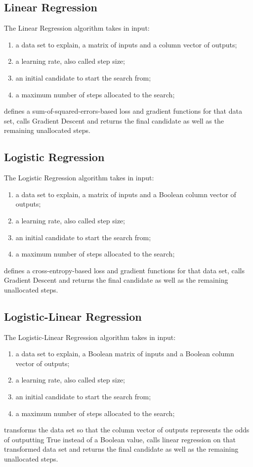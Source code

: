 \documentclass[]{report}
\begin{document}
\subsection{Linear Regression}
The Linear Regression algorithm takes in input:
\begin{enumerate}
\item a data set to explain, a matrix of inputs and a column vector
  of outputs;
\item a learning rate, also called step size;
\item an initial candidate to start the search from;
\item a maximum number of steps allocated to the search;
\end{enumerate}
defines a sum-of-squared-errors-based loss and gradient functions for
that data set, calls Gradient Descent and returns the final candidate
as well as the remaining unallocated steps.

\subsection{Logistic Regression}
The Logistic Regression algorithm takes in input:
\begin{enumerate}
\item a data set to explain, a matrix of inputs and a Boolean column
  vector of outputs;
\item a learning rate, also called step size;
\item an initial candidate to start the search from;
\item a maximum number of steps allocated to the search;
\end{enumerate}
defines a cross-entropy-based loss and gradient functions for that
data set, calls Gradient Descent and returns the final candidate as
well as the remaining unallocated steps.

\subsection{Logistic-Linear Regression}
The Logistic-Linear Regression algorithm takes in input:
\begin{enumerate}
\item a data set to explain, a Boolean matrix of inputs and a Boolean
  column vector of outputs;
\item a learning rate, also called step size;
\item an initial candidate to start the search from;
\item a maximum number of steps allocated to the search;
\end{enumerate}
transforms the data set so that the column vector of outputs
represents the odds of outputting True instead of a Boolean value,
calls linear regression on that transformed data set and returns the
final candidate as well as the remaining unallocated steps.
\end{document}
